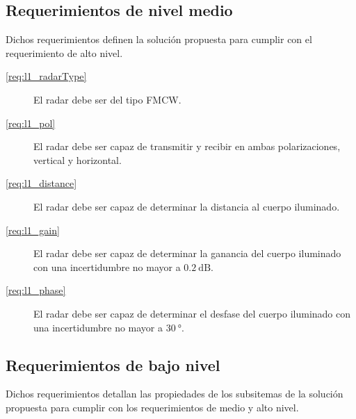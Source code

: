 \subsection{Requerimientos de nivel medio}

Dichos requerimientos definen la solución propuesta para cumplir con el requerimiento de alto nivel.

\begin{description}
  \item[\ref{req:l1_radarType}] El radar debe ser del tipo FMCW.
  \item[\ref{req:l1_pol}] El radar debe ser capaz de transmitir y recibir en ambas polarizaciones, vertical y horizontal.
  \item[\ref{req:l1_distance}] El radar debe ser capaz de determinar la distancia al cuerpo iluminado.
  \item[\ref{req:l1_gain}] El radar debe ser capaz de determinar la ganancia del cuerpo iluminado con una incertidumbre no mayor a $\SI{0.2}{\dB}$.
  \item[\ref{req:l1_phase}] El radar debe ser capaz de determinar el desfase del cuerpo iluminado con una incertidumbre no mayor a $\SI{30}{\degree}$.
\end{description}


\subsection{Requerimientos de bajo nivel}


Dichos requerimientos detallan las propiedades de los subsitemas de la solución propuesta para cumplir con los requerimientos de medio y alto nivel.

